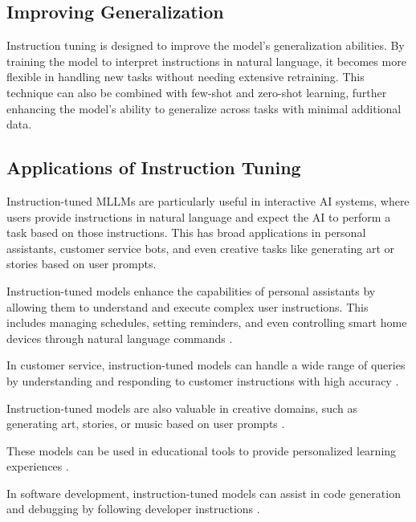 \subsection{Improving Generalization}

Instruction tuning is designed to improve the model’s generalization abilities. By training the model to interpret instructions in natural language, it becomes more flexible in handling new tasks without needing extensive retraining. This technique can also be combined with few-shot and zero-shot learning, further enhancing the model’s ability to generalize across tasks with minimal additional data.

\subsection{Applications of Instruction Tuning}

Instruction-tuned MLLMs are particularly useful in interactive AI systems, where users provide instructions in natural language and expect the AI to perform a task based on those instructions. This has broad applications in personal assistants, customer service bots, and even creative tasks like generating art or stories based on user prompts.

Instruction-tuned models enhance the capabilities of personal assistants by allowing them to understand and execute complex user instructions. This includes managing schedules, setting reminders, and even controlling smart home devices through natural language commands \cite{LarkSuite}.

In customer service, instruction-tuned models can handle a wide range of queries by understanding and responding to customer instructions with high accuracy \cite{OpenAICommunity}.

Instruction-tuned models are also valuable in creative domains, such as generating art, stories, or music based on user prompts \cite{RohitAggarwal}.

These models can be used in educational tools to provide personalized learning experiences \cite{RedditExperience}.

In software development, instruction-tuned models can assist in code generation and debugging by following developer instructions \cite{RohitAggarwal}.

